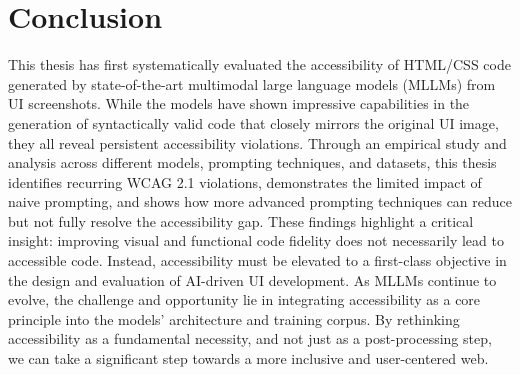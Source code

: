 \chapter{Conclusion}\label{chapter:Conclusion}
This thesis has first systematically evaluated the 
accessibility of HTML/CSS code generated by state-of-the-art 
multimodal large language models (MLLMs) from UI screenshots.
While the models have shown impressive capabilities in 
the generation of syntactically valid code that closely 
mirrors the original UI image, they all reveal 
persistent accessibility violations. Through an empirical study and analysis across 
different models, prompting techniques, and datasets, 
this thesis identifies recurring WCAG 2.1
violations, demonstrates the limited impact of naive 
prompting, and shows how more advanced prompting techniques 
can reduce but not fully resolve the accessibility gap.\newline
These findings highlight a critical insight: improving visual 
and functional code fidelity does not necessarily lead to 
accessible code. Instead, accessibility must be elevated 
to a first-class objective in the design and evaluation 
of AI-driven UI development.
As MLLMs continue to evolve, the challenge and opportunity 
lie in integrating accessibility as a core principle into 
the models' architecture and training corpus.
By rethinking accessibility as a fundamental necessity,
and not just as a post-processing step, we can take a 
significant step towards a more inclusive and user-centered 
web.